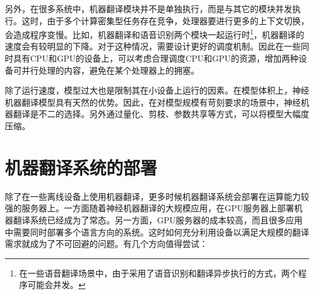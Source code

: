 \parinterval 另外，在很多系统中，机器翻译模块并不是单独执行，而是与其它的模块并发执行。这时，由于多个计算密集型任务存在竞争，处理器要进行更多的上下文切换，会造成程序变慢。比如，机器翻译和语音识别两个模块一起运行时{\footnote{在一些语音翻译场景中，由于采用了语音识别和翻译异步执行的方式，两个程序可能会并发。}}，机器翻译的速度会有较明显的下降。对于这种情况，需要设计更好的调度机制。因此在一些同时具有CPU和GPU的设备上，可以考虑合理调度CPU和GPU的资源，增加两种设备可并行处理的内容，避免在某个处理器上的拥塞。

\parinterval 除了运行速度，模型过大也是限制其在小设备上运行的因素。在模型体积上，神经机器翻译模型具有天然的优势。因此，在对模型规模有苛刻要求的场景中，神经机器翻译是不二的选择。另外通过量化、剪枝、参数共享等方式，可以将模型大幅度压缩。


\section{机器翻译系统的部署}

\parinterval 除了在一些离线设备上使用机器翻译，更多时候机器翻译系统会部署在运算能力较强的服务器上。一方面随着神经机器翻译的大规模应用，在GPU服务器上部署机器翻译系统已经成为了常态。另一方面，GPU服务器的成本较高，而且很多应用中需要同时部署多个语言方向的系统。这时如何充分利用设备以满足大规模的翻译需求就成为了不可回避的问题。有几个方向值得尝试：

